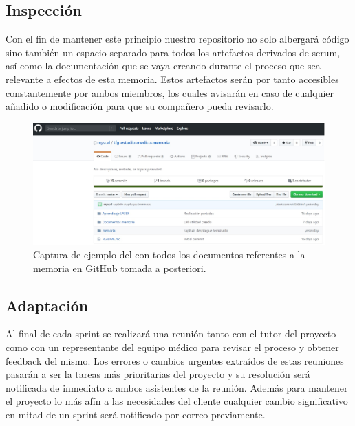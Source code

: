     \subsection{Inspección}
    Con el fin de mantener este principio nuestro repositorio no solo albergará código sino también un espacio separado para todos los artefactos derivados de scrum, así como la documentación que se vaya creando durante el proceso que sea relevante a efectos de esta memoria. Estos artefactos serán por tanto accesibles constantemente por ambos miembros, los cuales avisarán en caso de cualquier añadido o modificación para que su compañero pueda revisarlo.\newline
    
    \begin{figure}[h]
    \centering
     \includegraphics[width=1\textwidth]{images/GitHubMemoria.jpg}
    \caption{Captura de ejemplo del con todos los documentos referentes a la memoria en GitHub tomada a posteriori.}
    \end{figure}
    \newpage
    
     \subsection{Adaptación}
    Al final de cada sprint se realizará una reunión tanto con el tutor del proyecto como con un representante del equipo médico para revisar el proceso y obtener feedback del mismo. Los errores o cambios urgentes extraídos de estas reuniones pasarán a ser la tareas más prioritarias del proyecto y su resolución será notificada de inmediato a ambos asistentes de la reunión. Además para mantener el proyecto lo más afín a las necesidades del cliente cualquier cambio significativo en mitad de un sprint será notificado por correo previamente.
    \newline
    \newline
    \newline
    
